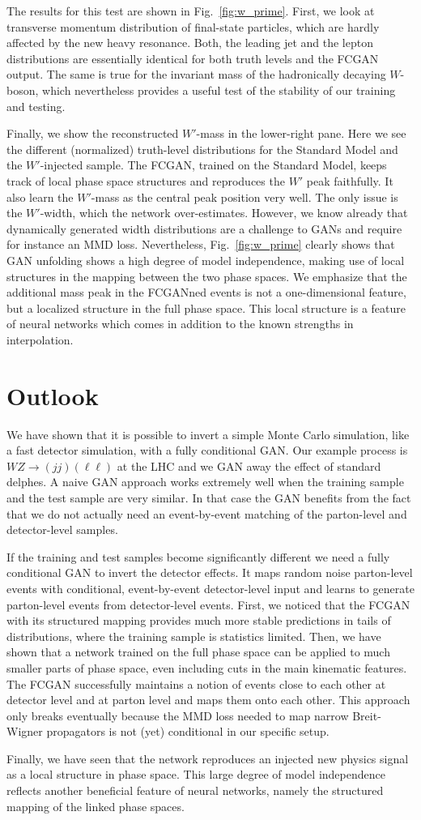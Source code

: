 The results for this test are shown in Fig.~\ref{fig:w_prime}. First,
we look at transverse momentum distribution of final-state particles,
which are hardly affected by the new heavy resonance. Both, the
leading jet and the lepton distributions are essentially identical for
both truth levels and the FCGAN output. The same is true for the
invariant mass of the hadronically decaying $W$-boson, which
nevertheless provides a useful test of the stability of our training
and testing.

Finally, we show the reconstructed $W'$-mass in the lower-right
pane. Here we see the different (normalized) truth-level distributions
for the Standard Model and the $W'$-injected sample. The FCGAN,
trained on the Standard Model, keeps track of local phase space
structures and reproduces the $W'$ peak faithfully. It also learn the
$W'$-mass as the central peak position very well. The only issue is
the $W'$-width, which the network over-estimates. However, we know
already that dynamically generated width distributions are a challenge
to GANs and require for instance an MMD loss.  Nevertheless,
Fig.~\ref{fig:w_prime} clearly shows that GAN unfolding shows a high
degree of model independence, making use of local structures in the
mapping between the two phase spaces. We emphasize that the additional
mass peak in the FCGANned events is not a one-dimensional feature, but
a localized structure in the full phase space. This local structure is
a feature of neural networks which comes in addition to the known
strengths in interpolation.

\section{Outlook}
We have shown that it is possible to invert a simple Monte Carlo
simulation, like a fast detector simulation, with a fully conditional
GAN. Our example process is $WZ \to (jj) (\ell \ell)$ at the LHC and
we GAN away the effect of standard delphes. A naive GAN approach
works extremely well when the training sample and the test sample are
very similar. In that case the GAN benefits from the fact that we do
not actually need an event-by-event matching of the parton-level and
detector-level samples.

If the training and test samples become significantly different we
need a fully conditional GAN to invert the detector effects. It maps
random noise parton-level events with conditional, event-by-event
detector-level input and learns to generate parton-level events from
detector-level events.  First, we noticed that the FCGAN with its
structured mapping provides much more stable predictions in tails of
distributions, where the training sample is statistics limited.  Then,
we have shown that a network trained on the full phase space can be
applied to much smaller parts of phase space, even including cuts in
the main kinematic features. The FCGAN successfully maintains a notion
of events close to each other at detector level and at parton level
and maps them onto each other. This approach only breaks eventually
because the MMD loss needed to map narrow Breit-Wigner propagators is
not (yet) conditional in our specific setup.

Finally, we have seen that the network reproduces an injected new
physics signal as a local structure in phase space. This large degree
of model independence reflects another beneficial feature of neural
networks, namely the structured mapping of the linked phase spaces.

%
